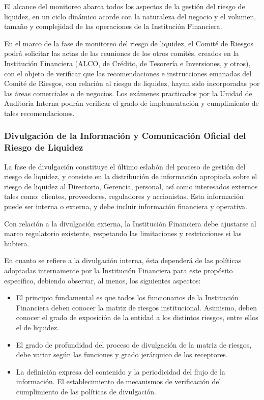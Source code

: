 \documentclass[]{article}
\begin{document}
El alcance del monitoreo abarca todos los aspectos de la gestión del
riesgo de liquidez, en un ciclo dinámico acorde con la naturaleza del
negocio y el volumen, tamaño y complejidad de las operaciones de la
Institución Financiera.

En el marco de la fase de monitoreo del riesgo de liquidez, el Comité de
Riesgos podrá solicitar las actas de las reuniones de los otros comités,
creados en la Institución Financiera (ALCO, de Crédito, de Tesorería e
Inversiones, y otros), con el objeto de verificar que las
recomendaciones e instrucciones emanadas del Comité de Riesgos, con
relación al riesgo de liquidez, hayan sido incorporadas por las áreas
comerciales o de negocios. Los exámenes practicados por la Unidad de
Auditoria Interna podrán verificar el grado de implementación y
cumplimiento de tales recomendaciones.

\hypertarget{divulgacion-de-la-informacion-y-comunicacion-oficial-del-riesgo-de-liquidez}{%
\subsubsection{Divulgación de la Información y Comunicación Oficial del
Riesgo de
Liquidez}\label{divulgacion-de-la-informacion-y-comunicacion-oficial-del-riesgo-de-liquidez}}

La fase de divulgación constituye el último eslabón del proceso de
gestión del riesgo de liquidez, y consiste en la distribución de
información apropiada sobre el riesgo de liquidez al Directorio,
Gerencia, personal, así como interesados externos tales como: clientes,
proveedores, reguladores y accionistas. Esta información puede ser
interna o externa, y debe incluir información financiera y operativa.

Con relación a la divulgación externa, la Institución Financiera debe
ajustarse al marco regulatorio existente, respetando las limitaciones y
restricciones si las hubiera.

En cuanto se refiere a la divulgación interna, ésta dependerá de las
políticas adoptadas internamente por la Institución Financiera para este
propósito específico, debiendo observar, al menos, los siguientes
aspectos:

\begin{itemize}
\item
  El principio fundamental es que todos los funcionarios de la
  Institución Financiera deben conocer la matriz de riesgos
  institucional. Asimismo, deben conocer el grado de exposición de la
  entidad a los distintos riesgos, entre ellos el de liquidez.
\item
  El grado de profundidad del proceso de divulgación de la matriz de
  riesgos, debe variar según las funciones y grado jerárquico de los
  receptores.
\item
  La definición expresa del contenido y la periodicidad del flujo de la
  información. El establecimiento de mecanismos de verificación del
  cumplimiento de las políticas de divulgación.
\end{itemize}
\end{document}
